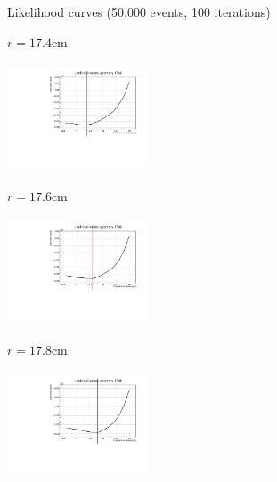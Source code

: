 \documentclass[handout,8 pt]{beamer}
\begin{document}
\begin{frame}{Likelihood curves (50.000 events, 100 iterations)}
\vspace{-5pt}
\begin{minipage}[c]{.32\textwidth}
\begin{exampleblock}{} \begin{center}$r = 17.4$cm\end{center} \end{exampleblock}
\includegraphics[width=4.2cm, height=3.2cm]{figs/likelihood100HighStat/likelihood17p4.pdf} 
\end{minipage}
\begin{minipage}[c]{.32\textwidth}
\begin{exampleblock}{} \begin{center}$r = 17.6$cm\end{center} \end{exampleblock}
\includegraphics[width=4.2cm, height=3.2cm]{figs/likelihood100HighStat/likelihood17p6.pdf} 
\end{minipage}
\begin{minipage}[c]{.32\textwidth}
\begin{exampleblock}{} \begin{center}$r = 17.8$cm\end{center} \end{exampleblock}
\includegraphics[width=4.2cm, height=3.2cm]{figs/likelihood100HighStat/likelihood17p8.pdf} 
\end{minipage}
\end{frame}
\end{document}
